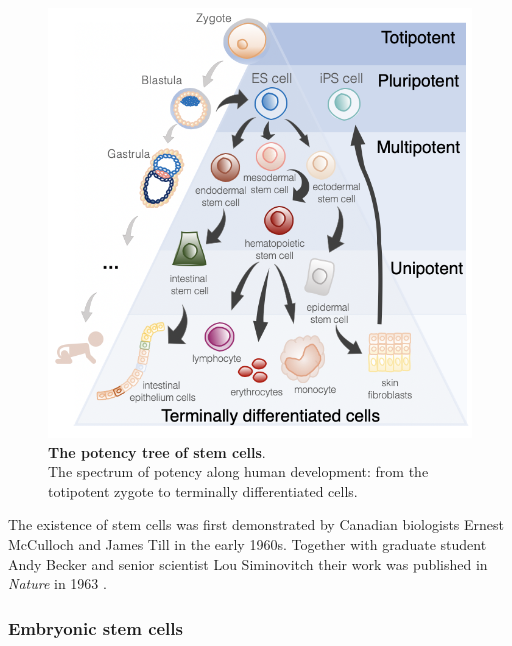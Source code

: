 \begin{figure}[htbp]
\centering
\includegraphics[width=16cm]{Chapter1/Fig/stem_cell_potency.png}
\caption[Stem Cells]{\textbf{The potency tree of stem cells}.\\
The spectrum of potency along human development: from the totipotent zygote to terminally differentiated cells. 
}
\label{fig:stem_cells}
\end{figure}

The existence of stem cells was first demonstrated by Canadian biologists Ernest McCulloch and James Till in the early 1960s.
Together with graduate student Andy Becker and senior scientist Lou Siminovitch their work was published in \textit{Nature} in 1963 \cite{becker1963cytological}.

\subsubsection{Embryonic stem cells}
\label{sec:esc_induction}

